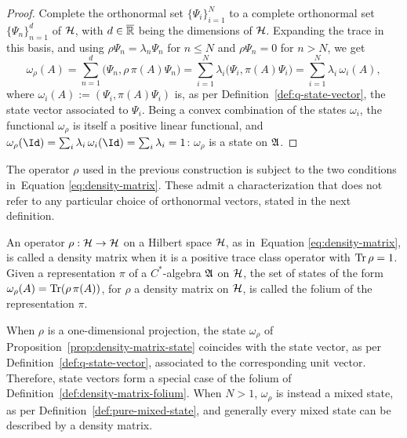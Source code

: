 \begin{proof}
	Complete the orthonormal set $\{\Psi_i\}_{i=1}^N$ to a complete orthonormal set $\{\Psi_n\}_{n=1}^d$ of $\H$, with $d \in \overline{\mathbb{R}}$ being the dimensions of $\H$. Expanding the trace in this basis, and using $\rho\Psi_n = \lambda_n\Psi_n$ for $n \le N$ and $\rho\Psi_n=0$ for $n>N$, we get
	\begin{equation}
		\omega_\rho(A) = \sum_{n=1}^d \big(\Psi_n, \rho\,\pi(A)\Psi_n\big) = \sum_{i=1}^N \lambda_i \big(\Psi_i,\pi(A)\Psi_i\big) = \sum_{i=1}^N \lambda_i\,\omega_i(A),
	\end{equation}
	where $\omega_i(A) := (\Psi_i,\pi(A)\Psi_i)$ is, as per Definition~\ref{def:q-state-vector}, the state vector associated to $\Psi_i$. Being a convex combination of the states $\omega_i$, the functional $\omega_\rho$ is itself a positive linear functional, and $\omega_\rho(\Id) = \sum_i \lambda_i\,\omega_i(\Id) = \sum_i \lambda_i = 1$: $\omega_\rho$ is a state on $\mathfrak{A}$.
\end{proof}

The operator $\rho$ used in the previous construction is subject to the two conditions in~Equation \eqref{eq:density-matrix}. These admit a characterization that does not refer to any particular choice of orthonormal vectors, stated in the next definition.

\begin{definition}
	\label{def:density-matrix-folium}
	An operator $\rho: \H \to \H$ on a Hilbert space $\H$, as in~Equation \eqref{eq:density-matrix}, is called a density matrix when it is a positive trace class operator with $\Tr\rho=1$. Given a representation $\pi$ of a $C^*$-algebra $\mathfrak{A}$ on $\H$, the set of states of the form $\omega_\rho(A) = \Tr(\rho\,\pi(A))$, for $\rho$ a density matrix on $\H$, is called the folium of the representation $\pi$.
\end{definition}

\begin{remark}
	When $\rho$ is a one-dimensional projection, the state $\omega_\rho$ of Proposition~\ref{prop:density-matrix-state} coincides with the state vector, as per Definition~\ref{def:q-state-vector}, associated to the corresponding unit vector. Therefore, state vectors form a special case of the folium of Definition~\ref{def:density-matrix-folium}. When $N>1$, $\omega_\rho$ is instead a mixed state, as per Definition~\ref{def:pure-mixed-state}, and generally every mixed state can be described by a density matrix.
\end{remark}

